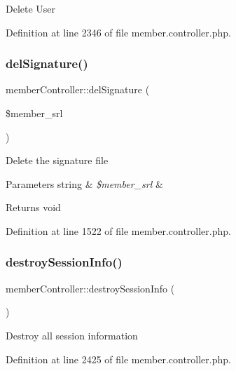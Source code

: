 Delete User 

Definition at line 2346 of file member.\+controller.\+php.

\mbox{\label{classmemberController_a0fa2ec662eb7a40333ca2049a103385e}} 
\subsubsection{\texorpdfstring{del\+Signature()}{delSignature()}}
{\footnotesize\ttfamily member\+Controller\+::del\+Signature (\begin{DoxyParamCaption}\item[{}]{\$member\+\_\+srl }\end{DoxyParamCaption})}

Delete the signature file


\begin{DoxyParams}[1]{Parameters}
string & {\em \$member\+\_\+srl} & \\
\hline
\end{DoxyParams}
\begin{DoxyReturn}{Returns}
void 
\end{DoxyReturn}


Definition at line 1522 of file member.\+controller.\+php.

\mbox{\label{classmemberController_ac259eb5e2f5ea0b7e747608fa1a308bd}} 
\subsubsection{\texorpdfstring{destroy\+Session\+Info()}{destroySessionInfo()}}
{\footnotesize\ttfamily member\+Controller\+::destroy\+Session\+Info (\begin{DoxyParamCaption}{ }\end{DoxyParamCaption})}

Destroy all session information 

Definition at line 2425 of file member.\+controller.\+php.

\mbox{\label{classmemberController_aeb2590d01346c9a25c2b22f99429f6a3}} 
